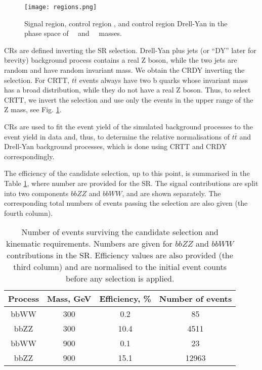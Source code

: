 \begin{figure}[!htb]%
  \begin{center}
    \texttt{[image: regions.png]}
    \caption{ Signal region, control region \ttbar, and control region Drell-Yan in the phase space of \ZtoLL \ ~and ~\HBB ~masses.    }
    \label{fig:regions}
  \end{center}
\end{figure}

CRs are defined inverting the SR selection. Drell-Yan plus jets (or ``DY'' later for brevity) background process contains a real Z boson, while the two jets are random and have random invariant mass. We obtain the CRDY inverting the \HBB selection. For CRTT, $t\bar{t}$ events always have two b quarks whose invariant mass has a broad distribution, while they do not have a real Z boson. Thus, to select CRTT, we invert the \Zll selection and use only the events in the upper range of the Z mass, see Fig. \ref{fig:regions}. 

CRs are used to fit the event yield of the simulated background processes to the event yield in data and, thus, to determine the relative normalisations of $t\bar{t}$ and Drell-Yan background processes, which is done using CRTT and CRDY correspondingly. 

The efficiency of the candidate selection, up to this point, is summarised in the Table \ref{eff_upto_bdt}, where number are provided for the SR. The signal contributions are split into two components $bbZZ$ and $bbWW$, and are shown separately. The corresponding total numbers of events passing the selection are also given (the fourth column).



\begin{table}
\begin{center}
\caption{Number of events surviving the candidate selection and kinematic requirements. Numbers are given for $bbZZ$ and $bbWW$ contributions in the SR. Efficiency values are also provided (the third column) and are normalised to the initial event counts before any selection is applied.}
\begin{tabular}{ |c|c|c|c| } \hline
{Process} & Mass, GeV & Efficiency, \% & Number of events \\\hline
bbWW & 300 &  0.2 & 85\\
bbZZ & 300 &  10.4 & 4511\\
bbWW & 900 &  0.1 & 23\\
bbZZ & 900 &  15.1 & 12963\\\hline
\end{tabular}
 \label{eff_upto_bdt}
\end{center}
\end{table}



